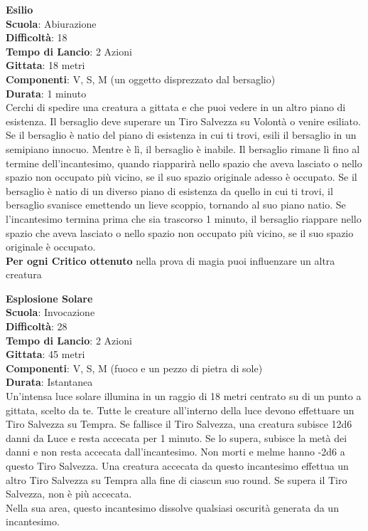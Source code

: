 \begin{multicols}{2}
\medskip\textbf{Esilio}\\
\textbf{Scuola}: Abiurazione\\
\textbf{Difficoltà}: 18\\
\textbf{Tempo di Lancio}: 2 Azioni\\
\textbf{Gittata}: 18 metri\\
\textbf{Componenti}: V, S, M (un oggetto disprezzato dal bersaglio)\\
\textbf{Durata}: 1 minuto\\
Cerchi di spedire una creatura a gittata e che puoi vedere in un altro piano di esistenza. Il bersaglio deve superare un Tiro Salvezza su Volontà o venire esiliato. Se il bersaglio è natio del piano di esistenza in cui ti trovi, esili il bersaglio in un semipiano innocuo. Mentre è lì, il bersaglio è inabile. Il bersaglio rimane lì fino al termine dell'incantesimo, quando riapparirà nello spazio che aveva lasciato o nello spazio non occupato più vicino, se il suo spazio originale adesso è occupato. Se il bersaglio è natio di un diverso piano di esistenza da quello in cui ti trovi, il bersaglio svanisce emettendo un lieve scoppio, tornando al suo piano natio. Se l'incantesimo termina prima che sia trascorso 1 minuto, il bersaglio riappare nello spazio che aveva lasciato o nello spazio non occupato più vicino, se il suo spazio originale è occupato.\\
\textbf{Per ogni Critico ottenuto} nella prova di magia puoi influenzare un altra creatura

\medskip\textbf{Esplosione Solare}\\
\textbf{Scuola}: Invocazione\\
\textbf{Difficoltà}: 28\\
\textbf{Tempo di Lancio}: 2 Azioni\\
\textbf{Gittata}: 45 metri\\
\textbf{Componenti}: V, S, M (fuoco e un pezzo di pietra di sole)\\
\textbf{Durata}: Istantanea\\
Un'intensa luce solare illumina in un raggio di 18 metri centrato su di un punto a gittata, scelto da te. Tutte le creature all'interno della luce devono effettuare un Tiro Salvezza su Tempra. Se fallisce il Tiro Salvezza, una creatura subisce 12d6 danni da Luce e resta accecata per 1 minuto. Se lo supera, subisce la metà dei danni e non resta accecata dall'incantesimo. Non morti e melme hanno -2d6 a questo Tiro Salvezza. Una creatura accecata da questo incantesimo effettua un altro Tiro Salvezza su Tempra alla fine di ciascun suo round. Se supera il Tiro Salvezza, non è più accecata.\\
Nella sua area, questo incantesimo dissolve qualsiasi oscurità generata da un incantesimo. 


\end{multicols}
